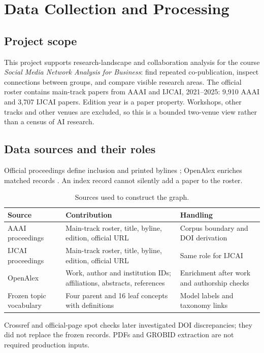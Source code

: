 \chapter{Data Collection and Processing}
\label{ch:data}
\section{Project scope}
This project supports research-landscape and collaboration analysis for the
course \emph{Social Media Network Analysis for Business}: find repeated
co-publication, inspect connections between groups, and compare visible
research areas. The official roster contains \Papers{} main-track
papers from AAAI and IJCAI, 2021--2025: 9,910 AAAI and 3,707 IJCAI papers.
Edition year is a paper property. Workshops, other tracks and other venues are
excluded, so this is a bounded two-venue view rather than a census of AI research.

\section{Data sources and their roles}
Official proceedings define inclusion and printed bylines
\citep{aaaiProceedings,ijcaiProceedings}; OpenAlex enriches matched records
\citep{openalexworks}. An index record cannot silently add a paper to the roster.

\begin{table}[!htbp]\centering\small
\caption{Sources used to construct the graph.}\label{tab:sources}
\begin{tabularx}{\textwidth}{>{\raggedright\arraybackslash}p{2.8cm}YY}\toprule
Source & Contribution & Handling\\\midrule
AAAI proceedings & Main-track roster, title, byline, edition, official URL & Corpus boundary and DOI derivation\\
IJCAI proceedings & Main-track roster, title, byline, edition, official URL & Same role for IJCAI\\
OpenAlex & Work, author and institution IDs; affiliations, abstracts, references & Enrichment after work and authorship checks\\
Frozen topic vocabulary & Four parent and 16 leaf concepts with definitions & Model labels and taxonomy links\\\bottomrule
\end{tabularx}\end{table}

Crossref and official-page spot checks later investigated DOI discrepancies;
they did not replace the frozen records. PDFs and GROBID extraction are not
required production inputs.

